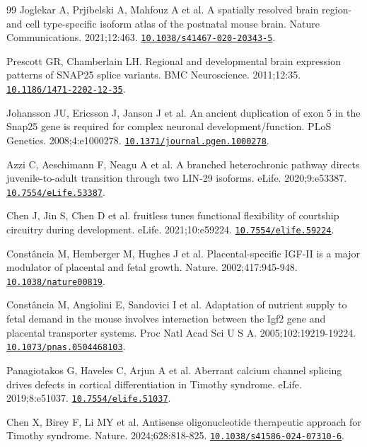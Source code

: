 \documentclass[11pt,a4paper]{article}
\begin{document}
\begin{thebibliography}{99}
Joglekar A, Prjibelski A, Mahfouz A et al. A spatially resolved brain region- and cell type-specific isoform atlas of the postnatal mouse brain. Nature Communications. 2021;12:463. \href{https://doi.org/10.1038/s41467-020-20343-5}{\nolinkurl{10.1038/s41467-020-20343-5}}.

Prescott GR, Chamberlain LH. Regional and developmental brain expression patterns of SNAP25 splice variants. BMC Neuroscience. 2011;12:35. \href{https://doi.org/10.1186/1471-2202-12-35}{\nolinkurl{10.1186/1471-2202-12-35}}.

Johansson JU, Ericsson J, Janson J et al. An ancient duplication of exon 5 in the Snap25 gene is required for complex neuronal development/function. PLoS Genetics. 2008;4:e1000278. \href{https://doi.org/10.1371/journal.pgen.1000278}{\nolinkurl{10.1371/journal.pgen.1000278}}.

Azzi C, Aeschimann F, Neagu A et al. A branched heterochronic pathway directs juvenile-to-adult transition through two LIN-29 isoforms. eLife. 2020;9:e53387. \href{https://doi.org/10.7554/eLife.53387}{\nolinkurl{10.7554/eLife.53387}}.

Chen J, Jin S, Chen D et al. fruitless tunes functional flexibility of courtship circuitry during development. eLife. 2021;10:e59224. \href{https://doi.org/10.7554/elife.59224}{\nolinkurl{10.7554/elife.59224}}.

Constância M, Hemberger M, Hughes J et al. Placental-specific IGF-II is a major modulator of placental and fetal growth. Nature. 2002;417:945-948. \href{https://doi.org/10.1038/nature00819}{\nolinkurl{10.1038/nature00819}}.

Constância M, Angiolini E, Sandovici I et al. Adaptation of nutrient supply to fetal demand in the mouse involves interaction between the Igf2 gene and placental transporter systems. Proc Natl Acad Sci U S A. 2005;102:19219-19224. \href{https://doi.org/10.1073/pnas.0504468103}{\nolinkurl{10.1073/pnas.0504468103}}.

Panagiotakos G, Haveles C, Arjun A et al. Aberrant calcium channel splicing drives defects in cortical differentiation in Timothy syndrome. eLife. 2019;8:e51037. \href{https://doi.org/10.7554/elife.51037}{\nolinkurl{10.7554/elife.51037}}.

Chen X, Birey F, Li MY et al. Antisense oligonucleotide therapeutic approach for Timothy syndrome. Nature. 2024;628:818-825. \href{https://doi.org/10.1038/s41586-024-07310-6}{\nolinkurl{10.1038/s41586-024-07310-6}}.


\end{thebibliography}
\end{document}
